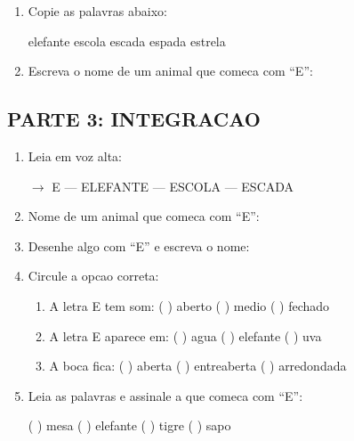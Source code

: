 \begin{exercicio}
\begin{enumerate}[resume]
  \item Copie as palavras abaixo:
  \begin{center}
  elefante \quad escola \quad escada \quad espada \quad estrela
  \end{center}

  \item Escreva o nome de um animal que comeca com ``E'':
  \begin{center}
  \underline{\hspace{6cm}}
  \end{center}
\end{enumerate}

\subsection*{PARTE 3: INTEGRACAO}

\begin{enumerate}[resume]
  \item Leia em voz alta:
  \begin{center}
  $\rightarrow$ E --- ELEFANTE --- ESCOLA --- ESCADA
  \end{center}

  \item Nome de um animal que comeca com ``E'':
  \begin{center}
  \underline{\hspace{6cm}}
  \end{center}

  \item Desenhe algo com ``E'' e escreva o nome:
  \begin{center}
  \end{center}

  \item Circule a opcao correta:
  \begin{enumerate}[label=(\alph*)]
    \item A letra E tem som: ( ) aberto ( ) medio ( ) fechado
    \item A letra E aparece em: ( ) agua ( ) elefante ( ) uva
    \item A boca fica: ( ) aberta ( ) entreaberta ( ) arredondada
  \end{enumerate}

  \item Leia as palavras e assinale a que comeca com ``E'':
  \begin{center}
  ( ) mesa \quad ( ) elefante \quad ( ) tigre \quad ( ) sapo
  \end{center}
\end{enumerate}
\end{exercicio}

